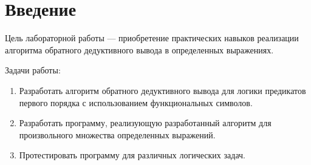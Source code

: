 \chapter*{Введение}

Цель лабораторной работы --- приобретение практических навыков реализации алгоритма обратного дедуктивного вывода в определенных выражениях.

Задачи работы:
\begin{enumerate}
    \item Разработать алгоритм обратного дедуктивного вывода для логики предикатов первого порядка с использованием функциональных символов.
    \item Разработать программу, реализующую разработанный алгоритм для произвольного множества определенных выражений.
    \item Протестировать программу для различных логических задач.
\end{enumerate}
